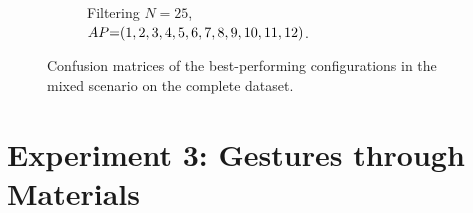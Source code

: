 \begin{figure}
\begin{subfigure}{.69\linewidth}
      \vspace{-12pt}
      \caption{Filtering $N{=}25$, \\ $\splitatcommas{AP{=}(1, 2, 3, 4, 5, 6, 7, 8, 9, 10, 11, 12)}$.}
      \label{fig:radar-experiments:confusion-exp1-Mixed-filtering}
  \end{subfigure}
  \caption{Confusion matrices of the best-performing configurations in the mixed scenario on the complete dataset.}
  \label{fig:radar-experiments:confusion-exp1-Mixed}
  \vspace{-20pt}
\end{figure}

\FloatBarrier

\section{Experiment 3: Gestures through Materials}
